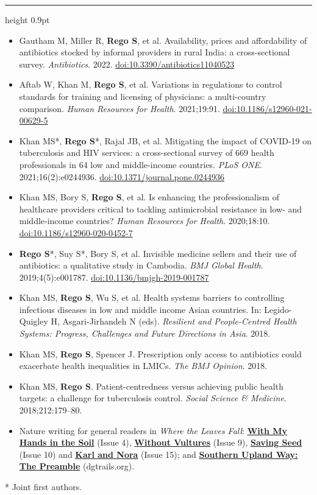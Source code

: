 \documentclass[10pt, letterpaper]{article}
\newcommand*{\lightseries}{\fontseries{l}\selectfont}
\newcommand*{\sectionstyle}[1]{{\fontsize{15pt}{1em}\selectfont\bfseries\color{text}#1}}
\newcommand*{\descriptionstyle}{\fontsize{9pt}{12pt}\selectfont\lightseries\color{text}}
\newcommand*{\sectioncolor}[3]{{\color{awesome}#1#2#3}}
\newcommand{\cvsection}[1]{%
  \par\addvspace{3ex plus 1ex}%
  \needspace{5\baselineskip}%
  \noindent\sectionstyle{\sectioncolor#1}\hspace{0.8ex}%
  {\color{graytext}\leaders\hrule height 0.9pt\hfill\kern0pt}%
  \par\nobreak\addvspace{1.2ex}%
}
\newenvironment{cvitems}{%
  \par\nobreak\vspace{0.6ex}%
  \descriptionstyle\justifying
  \begin{itemize}[leftmargin=2ex, label={\textbullet}, nosep, itemsep=3pt plus 1pt, beginpenalty=10000]%
}{%
  \ifhmode\unskip\InsertMark{cventry}{}\fi  %
  \end{itemize}%
}
\newcommand*{\doi}[1]{\href{https://doi.org/#1}{doi:#1}}
\begin{document}
\cvsection{Publications \& Writing}
\begin{cvitems}\RaggedRight
  \item Gautham M, Miller R, \textbf{Rego S}, et al. Availability, prices and affordability of antibiotics stocked by informal providers in rural India: a cross-sectional survey. \textit{Antibiotics}. 2022. \doi{10.3390/antibiotics11040523}
  \item Aftab W, Khan M, \textbf{Rego S}, et al. Variations in regulations to control standards for training and licensing of physicians: a multi-country comparison. \textit{Human Resources for Health}. 2021;19:91. \doi{10.1186/s12960-021-00629-5}
  \item Khan MS*, \textbf{Rego S}*, Rajal JB, et al. Mitigating the impact of COVID-19 on tuberculosis and HIV services: a cross-sectional survey of 669 health professionals in 64 low and middle-income countries. \textit{PLoS ONE}. 2021;16(2):e0244936. \doi{10.1371/journal.pone.0244936}
  \item Khan MS, Bory S, \textbf{Rego S}, et al. Is enhancing the professionalism of healthcare providers critical to tackling antimicrobial resistance in low- and middle-income countries? \textit{Human Resources for Health}. 2020;18:10. \doi{10.1186/s12960-020-0452-7}
  \item \textbf{Rego S}*, Suy S*, Bory S, et al. Invisible medicine sellers and their use of antibiotics: a qualitative study in Cambodia. \textit{BMJ Global Health}. 2019;4(5):e001787. \doi{10.1136/bmjgh-2019-001787}
  \item Khan MS, \textbf{Rego S}, Wu S, et al. Health systems barriers to controlling infectious diseases in low and middle income Asian countries. In: Legido-Quigley H, Asgari-Jirhandeh N (eds). \textit{Resilient and People-Centred Health Systems: Progress, Challenges and Future Directions in Asia}. 2018.
  \item Khan MS, \textbf{Rego S}, Spencer J. Prescription only access to antibiotics could exacerbate health inequalities in LMICs. \textit{The BMJ Opinion}. 2018.
  \item Khan MS, \textbf{Rego S}. Patient-centredness versus achieving public health targets: a challenge for tuberculosis control. \textit{Social Science \& Medicine}. 2018;212:179--80.
  \item Nature writing for general readers in \textit{Where the Leaves Fall}:
    \href{https://wheretheleavesfall.com/stories/with-my-hands-in-the-soil}{\textbf{With My Hands in the Soil}} (Issue 4),
    \href{https://wheretheleavesfall.com/stories/without-vultures}{\textbf{Without Vultures}} (Issue 9),
    \href{https://wheretheleavesfall.com/explore/pictures/saving-seed/}{\textbf{Saving Seed}} (Issue 10) and
    \href{https://wheretheleavesfall.com/stories/karl-and-nora}{\textbf{Karl and Nora}} (Issue 15);
    and \href{https://dgtrails.org/southern-upland-way-the-preamble/}{\textbf{Southern Upland Way: The Preamble}} (dgtrails.org).
\end{cvitems}
\vspace{0.6ex}
{\descriptionstyle * Joint first authors.\par}
\end{document}
